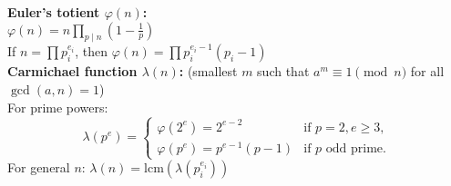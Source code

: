 \textbf{Euler's totient $\varphi(n)$:} \\[1mm]
$\varphi(n)=n\prod_{p\mid n}\left(1-\frac{1}{p}\right)$ \\
If $n=\prod p_i^{e_i}$, then $\varphi(n)=\prod p_i^{e_i-1}(p_i-1)$ \\

\textbf{Carmichael function $\lambda(n)$:} (smallest $m$ such that $a^m\equiv1\pmod n$ for all $\gcd(a,n)=1$) \\[1mm]
For prime powers: \\
\[
\lambda(p^e) = 
\begin{cases}
\varphi(2^e)=2^{e-2} & \text{if }p=2, e\ge3,\\
\varphi(p^e)=p^{e-1}(p-1) & \text{if }p \text{ odd prime}.
\end{cases}
\]
For general $n$: $\lambda(n)=\mathrm{lcm}(\lambda(p_i^{e_i}))$ \\
